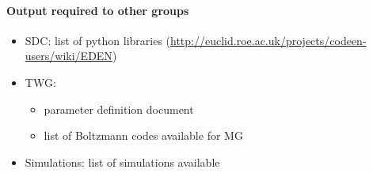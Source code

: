 \paragraph{Output required to other groups}
\begin{itemize}
 \item SDC: list of python libraries (\url{http://euclid.roe.ac.uk/projects/codeen-users/wiki/EDEN})
 \item TWG:
 \begin{itemize}
  \item parameter definition document
  \item list of Boltzmann codes available for MG
 \end{itemize}
 \item Simulations: list of simulations available
\end{itemize}





%



